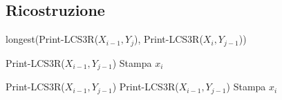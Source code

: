 \subsection{Ricostruzione}
\begin{algorithm}[H]
    \caption{Print-LCS3R}
    \begin{algorithmic}[1]
                \State \Return
            \EndIf

                \State \Return longest(Print-LCS3R($X_{i-1},Y_{j}$), Print-LCS3R($X_{i}, Y_{j-1}$))

                \Else
                        \State Print-LCS3R($X_{i-1},Y_{j-1}$)
                        \State Stampa $x_i$
                    
                        \Else
                                \State Print-LCS3R($X_{i-1},Y_{j-1}$)
                            \Else
                                \State Print-LCS3R($X_{i-1},Y_{j-1}$)
                                \State Stampa $x_i$
                            \EndIf

                    \EndIf
            \EndIf
        \EndProcedure
    \end{algorithmic}
\end{algorithm}